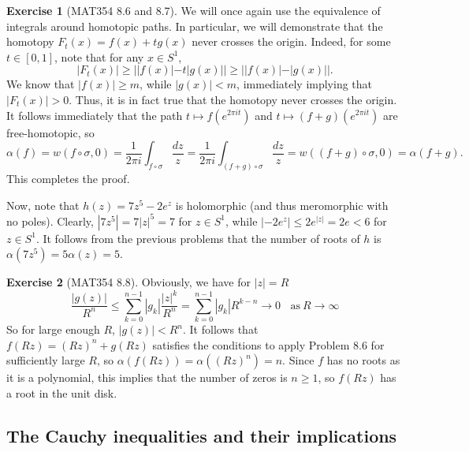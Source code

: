 \documentclass[aps,pra,showpacs,notitlepage,onecolumn,superscriptaddress,nofootinbib]{revtex4-1}
\theoremstyle{definition}
\newtheorem{exercise}{Exercise}[section]
\newcommand{\hhrulefill}{\hspace{-1.5em} \hrulefill}
\begin{document}
\hhrulefill

\begin{exercise}[MAT354 8.6 and 8.7]
  We will once again use the equivalence of integrals around homotopic paths. In particular, we will demonstrate that the homotopy $F_t(x) = f(x) + t g(x)$ never crosses
  the origin. Indeed, for some $t \in [0, 1]$, note that for any $x \in S^1$,
  $$|F_t(x)| \geq ||f(x)| - t |g(x)|| \geq ||f(x)| - |g(x)||.$$
  We know that $|f(x)| \geq m$, while $|g(x)| < m$, immediately implying that $|F_t(x)| > 0$. Thus, it is in fact true that the homotopy never crosses the origin. It follows
  immediately that the path $t \mapsto f(e^{2\pi i t})$ and $t \mapsto (f + g)(e^{2 \pi i t})$ are free-homotopic, so
  \begin{equation}
    \alpha(f) = w(f \circ \sigma, 0) = \frac{1}{2\pi i} \displaystyle\int_{f \circ \sigma} \frac{dz}{z} = \frac{1}{2\pi i} \displaystyle\int_{(f + g) \circ \sigma} \frac{dz}{z} = w((f + g) \circ \sigma, 0) = \alpha(f + g).
  \end{equation}
  This completes the proof.
  \newline

  \noindent Now, note that $h(z) = 7z^5 - 2e^{z}$ is holomorphic (and thus meromorphic with no poles). Clearly, $|7 z^5| = 7 |z|^5 = 7$ for $z \in S^1$, while $|-2e^{z}| \leq 2 e^{|z|} = 2e < 6$ for $z \in S^1$.
  It follows from the previous problems that the number of roots of $h$ is $\alpha(7 z^{5}) = 5 \alpha(z) = 5$.
\end{exercise}

\hhrulefill

\begin{exercise}[MAT354 8.8]
  Obviously, we have for $|z| = R$
  \begin{equation}
    \frac{|g(z)|}{R^n} \leq \displaystyle\sum_{k = 0}^{n - 1} |g_k| \frac{|z|^k}{R^n} = \displaystyle\sum_{k = 0}^{n - 1} |g_k| R^{k - n} \rightarrow 0 \ \ \ \ \text{as} \ R \to \infty
  \end{equation}
  So for large enough $R$, $|g(z)| < R^n$. It follows that $f(Rz) = (Rz)^n + g(Rz)$ satisfies the conditions to apply Problem 8.6 for sufficiently large $R$,
  so $\alpha(f(Rz)) = \alpha((Rz)^n) = n$. Since $f$ has no roots as it is a polynomial, this implies that the number of zeros is $n \geq 1$, so $f(Rz)$ has a root in the unit disk.
\end{exercise}

\hhrulefill

\subsection{The Cauchy inequalities and their implications}
\end{document}
